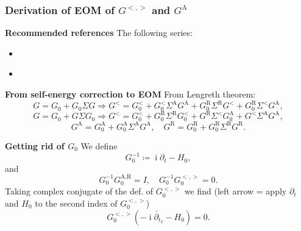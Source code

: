 \documentclass[t]{beamer}
\DeclareMathOperator{\ii}{i}
\begin{document}
\begin{frame}[allowframebreaks]
\frametitle{Derivation of EOM of $G^{<,>}$ and $G^{\text{A}}$}

\textbf{Recommended references} The following series:
\begin{itemize}
    \item \cite{vspivcka2005long} 
    \item \cite{rammer1986quantum}
\end{itemize}

\vspace{0.25cm}

\framebreak

\textbf{From self-energy correction to EOM} From Lengreth theorem:
\begin{equation}
    G = G_0 + G_0 \Sigma G \Rightarrow 
    G^< = G^<_0 + G^<_0 \Sigma^{\text{A}} G^{\text{A}}
    + G_0^{\text{R}} \Sigma^{\text{R}} G^< 
    + G_0^{\text{R}} \Sigma^{<} G^\text{A} ,
    \label{eq:lesser-eom-1}
\end{equation}
\begin{equation}
    G = G_0 + G \Sigma G_0 \Rightarrow 
    G^< = G^<_0 + G^{\text{R}}_0 \Sigma^{\text{R}} G^{<}_0
    + G^{\text{R}} \Sigma^{<} G^{\text{A}}_0 
    + G^{<} \Sigma^{\text{A}} G^\text{A} ,
    \label{eq:lesser-eom-2}
\end{equation}
\begin{equation}
    G^{\text{A}} = G^{\text{A}}_0 + G^{\text{A}}_0 \Sigma^{\text{A}} G^{\text{A}}, \quad 
    G^{\text{R}} = G^{\text{R}}_0 + G^{\text{R}}_0 \Sigma^{\text{R}} G^{\text{R}}.
    \label{eq:G-a-r-eom-original}
\end{equation}

\vspace{0.25cm}

\textbf{Getting rid of $G_0$} We define 
\begin{equation}
    G_0^{-1} \coloneqq \ii \partial_t - H_0,
\end{equation}
and 
\begin{equation}
    G_0^{-1} G_0^{\text{A}, \text{R}} = I, \quad 
    G_0^{-1} G_0^{<,>} = 0.
\end{equation}
Taking complex conjugate of the def. of $G^{<,>}_0$ we find 
(left arrow = apply $\partial_t$ and $H_0$ to the second index of $G_0^{<,>}$)
\begin{equation}
    G_0^{<,>} (- \ii \overleftarrow{\partial_{t_2}} - H_0) = 0.
\end{equation}


\end{frame}
\end{document}
